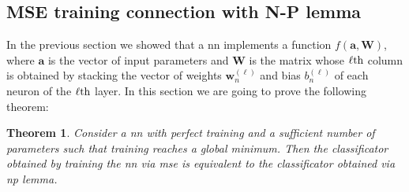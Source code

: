 \documentclass[draftcls,onecolumn,12pt]{IEEEtran}
\newtheorem{theorem}{Theorem}
\begin{document}
\subsection{MSE training connection with N-P lemma}
In the previous section we showed that a \ac{nn} implements a function $f(\bm{a},\bm{W})$, where $\bm{a}$ is the vector of input parameters and $\bm{W}$ is the matrix whose $\ell{\rm th}$ column is obtained by stacking the vector of weights $\bm{w}_n^{(\ell)}$ and bias $b_n^{(\ell)}$ of each neuron of the $\ell{\rm th}$ layer. In this section we are going to prove the following theorem:
\begin{theorem}
\label{th:nn_np}
Consider a \ac{nn} with perfect training and a sufficient number of parameters such that training reaches a global minimum. Then the classificator obtained by training the \ac{nn} via \ac{mse} is equivalent to the classificator obtained via \ac{np} lemma.
\end{theorem}
\end{document}
